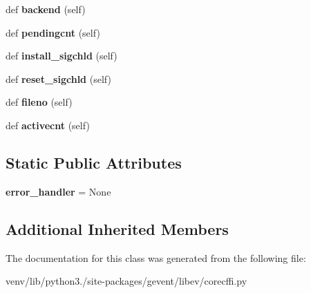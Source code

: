 \begin{DoxyCompactItemize}
def {\bfseries backend} (self)
\item 
\mbox{\label{classgevent_1_1libev_1_1corecffi_1_1loop_ae1754a1eee8fea06a64b901e9e38307f}} 
def {\bfseries pendingcnt} (self)
\item 
\mbox{\label{classgevent_1_1libev_1_1corecffi_1_1loop_a712396d72a641b52e251951192d7e5a8}} 
def {\bfseries install\+\_\+sigchld} (self)
\item 
\mbox{\label{classgevent_1_1libev_1_1corecffi_1_1loop_a16e152eacada56b8132526101291de0f}} 
def {\bfseries reset\+\_\+sigchld} (self)
\item 
\mbox{\label{classgevent_1_1libev_1_1corecffi_1_1loop_a645e40f94e68b071d0062ef1470976f1}} 
def {\bfseries fileno} (self)
\item 
\mbox{\label{classgevent_1_1libev_1_1corecffi_1_1loop_ad854e3b64581355a9166a2a6334f0826}} 
def {\bfseries activecnt} (self)
\end{DoxyCompactItemize}
\subsection*{Static Public Attributes}
\begin{DoxyCompactItemize}
\item 
\mbox{\label{classgevent_1_1libev_1_1corecffi_1_1loop_a87d66cfaf41ab4308d7c45ad3917416e}} 
{\bfseries error\+\_\+handler} = None
\end{DoxyCompactItemize}
\subsection*{Additional Inherited Members}


The documentation for this class was generated from the following file\+:\begin{DoxyCompactItemize}
\item 
venv/lib/python3./site-\/packages/gevent/libev/corecffi.\+py\end{DoxyCompactItemize}
